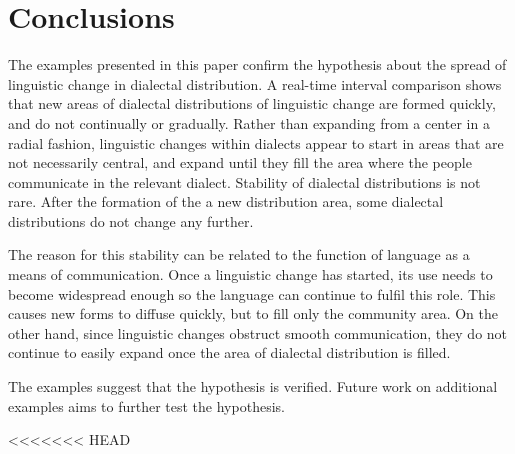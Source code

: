 \documentclass[output=paper]{LSP/langsci}
\begin{document}
\section{Conclusions}
The examples presented in this paper confirm the hypothesis about the spread of linguistic change in dialectal distribution. A real-time interval comparison shows that new areas of dialectal distributions of linguistic change are formed quickly, and do not continually or gradually. Rather than expanding from a center in a radial fashion, linguistic changes within dialects appear to start in areas that are not necessarily central, and expand until they fill the area where the people communicate in the relevant dialect. Stability of dialectal distributions is not rare. After the formation of the a new distribution area, some dialectal distributions do not change any further.

The reason for this stability can be related to the function of language as a means of communication. Once a linguistic change has started, its use needs to become widespread enough so the language can continue to fulfil this role. This causes new forms to diffuse quickly, but to fill only the community area. On the other hand, since linguistic changes obstruct smooth communication, they do not continue to easily expand once the area of dialectal distribution is filled.

The examples suggest that the hypothesis is verified. Future work on additional examples aims to further test the hypothesis.

\printbibliography[heading=subbibliography,notkeyword=this]
<<<<<<< HEAD
\end{document}
